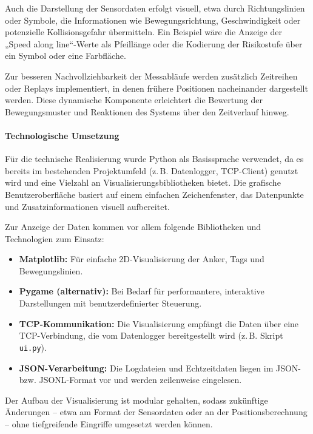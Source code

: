 \documentclass[a4paper, 12pt]{article} %
\begin{document}
Auch die Darstellung der Sensordaten erfolgt visuell, etwa durch Richtungslinien oder Symbole, die Informationen wie 
Bewegungsrichtung, Geschwindigkeit oder potenzielle Kollisionsgefahr übermitteln. Ein Beispiel wäre die Anzeige der „Speed along line“-Werte als
 Pfeillänge oder die Kodierung der Risikostufe über ein Symbol oder eine Farbfläche.

Zur besseren Nachvollziehbarkeit der Messabläufe werden zusätzlich Zeitreihen oder Replays implementiert, in denen 
frühere Positionen nacheinander dargestellt werden. Diese dynamische Komponente erleichtert die Bewertung der Bewegungsmuster und 
Reaktionen des Systems über den Zeitverlauf hinweg.

\paragraph{Technologische Umsetzung}

Für die technische Realisierung wurde Python als Basissprache verwendet, da es bereits im bestehenden Projektumfeld (z.\,B. Datenlogger, TCP-Client)
 genutzt wird und eine Vielzahl an Visualisierungsbibliotheken bietet. Die grafische Benutzeroberfläche basiert auf einem einfachen Zeichenfenster, das 
 Datenpunkte und Zusatzinformationen visuell aufbereitet. 

Zur Anzeige der Daten kommen vor allem folgende Bibliotheken und Technologien zum Einsatz:

\begin{itemize}
    \item \textbf{Matplotlib:} Für einfache 2D-Visualisierung der Anker, Tags und Bewegungslinien.
    \item \textbf{Pygame (alternativ):} Bei Bedarf für performantere, interaktive Darstellungen mit benutzerdefinierter Steuerung.
    \item \textbf{TCP-Kommunikation:} Die Visualisierung empfängt die Daten über eine TCP-Verbindung, die vom Datenlogger bereitgestellt wird (z.\,B. Skript \texttt{ui.py}).
    \item \textbf{JSON-Verarbeitung:} Die Logdateien und Echtzeitdaten liegen im \ac{JSON}- bzw. \ac{JSONL}-Format vor und werden zeilenweise eingelesen.
\end{itemize}

Der Aufbau der Visualisierung ist modular gehalten, sodass zukünftige Änderungen – etwa am Format der Sensordaten oder an der
 Positionsberechnung – ohne tiefgreifende Eingriffe umgesetzt werden können.
\end{document}
